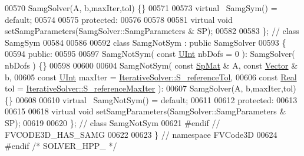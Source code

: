 \begin{DoxyCode}
00570         SamgSolver(A, b,maxIter,tol) \{\}
00571 
00573     \textcolor{keyword}{virtual} ~SamgSym() = \textcolor{keywordflow}{default};
00574 
00575 \textcolor{keyword}{protected}:
00576 
00578 
00581     \textcolor{keyword}{virtual} \textcolor{keywordtype}{void} setSamgParameters(SamgSolver::SamgParameters & SP);
00582 
00583 \}; \textcolor{comment}{// class SamgSym}
00584 
00586 
00592 \textcolor{keyword}{class }SamgNotSym : \textcolor{keyword}{public} SamgSolver
00593 \{
00594 \textcolor{keyword}{public}:
00595 
00597     SamgNotSym( \textcolor{keyword}{const} \hyperlink{namespaceFVCode3D_a4bf7e328c75d0fd504050d040ebe9eda}{UInt} nbDofs = 0 ): SamgSolver( nbDofs ) \{\}
00598 
00600 
00604     SamgNotSym( \textcolor{keyword}{const} \hyperlink{namespaceFVCode3D_ac1032289d96638cf0ad6c52ef639095f}{SpMat} & A, \textcolor{keyword}{const} \hyperlink{namespaceFVCode3D_a16ccf345652402bccd1a5d2e6782526c}{Vector} & b,
00605                 \textcolor{keyword}{const} \hyperlink{namespaceFVCode3D_a4bf7e328c75d0fd504050d040ebe9eda}{UInt} maxIter = \hyperlink{classFVCode3D_1_1IterativeSolver_a2afd68f254311907309444138d7f1b89}{IterativeSolver::S\_referenceTol},
00606                 \textcolor{keyword}{const} \hyperlink{namespaceFVCode3D_a40c1f5588a248569d80aa5f867080e83}{Real} tol = \hyperlink{classFVCode3D_1_1IterativeSolver_a938effdbfaa21c23226bfedf904787c2}{IterativeSolver::S\_referenceMaxIter}
       ):
00607         SamgSolver(A, b,maxIter,tol) \{\}
00608 
00610     \textcolor{keyword}{virtual} ~SamgNotSym() = \textcolor{keywordflow}{default};
00611 
00612 \textcolor{keyword}{protected}:
00613 
00615 
00618     \textcolor{keyword}{virtual} \textcolor{keywordtype}{void} setSamgParameters(SamgSolver::SamgParameters & SP);
00619 
00620 \}; \textcolor{comment}{// class SamgNotSym}
00621 \textcolor{preprocessor}{#endif // FVCODE3D\_HAS\_SAMG}
00622 
00623 \} \textcolor{comment}{// namespace FVCode3D}
00624 \textcolor{preprocessor}{#endif }\textcolor{comment}{/* SOLVER\_HPP\_ */}\textcolor{preprocessor}{}
\end{DoxyCode}
